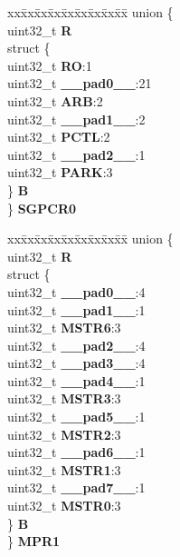 \begin{DoxyCompactItemize}
\begin{tabbing}
\end{tabbing}\item 
\mbox{\label{structXBAR__tag_a5d98b04b45ee335f1ea506401de12a4c}} 
\begin{tabbing}
xx\=xx\=xx\=xx\=xx\=xx\=xx\=xx\=xx\=\kill
union \{\\
\>uint32\_t {\bfseries R}\\
\>struct \{\\
\>\>uint32\_t {\bfseries RO}:1\\
\>\>uint32\_t {\bfseries \_\_pad0\_\_}:21\\
\>\>uint32\_t {\bfseries ARB}:2\\
\>\>uint32\_t {\bfseries \_\_pad1\_\_}:2\\
\>\>uint32\_t {\bfseries PCTL}:2\\
\>\>uint32\_t {\bfseries \_\_pad2\_\_}:1\\
\>\>uint32\_t {\bfseries PARK}:3\\
\>\} {\bfseries B}\\
\} {\bfseries SGPCR0}\\

\end{tabbing}\item 
\mbox{\label{structXBAR__tag_a027870adc24dd200af5ecada8c540bab}} 
\begin{tabbing}
xx\=xx\=xx\=xx\=xx\=xx\=xx\=xx\=xx\=\kill
union \{\\
\>uint32\_t {\bfseries R}\\
\>struct \{\\
\>\>uint32\_t {\bfseries \_\_pad0\_\_}:4\\
\>\>uint32\_t {\bfseries \_\_pad1\_\_}:1\\
\>\>uint32\_t {\bfseries MSTR6}:3\\
\>\>uint32\_t {\bfseries \_\_pad2\_\_}:4\\
\>\>uint32\_t {\bfseries \_\_pad3\_\_}:4\\
\>\>uint32\_t {\bfseries \_\_pad4\_\_}:1\\
\>\>uint32\_t {\bfseries MSTR3}:3\\
\>\>uint32\_t {\bfseries \_\_pad5\_\_}:1\\
\>\>uint32\_t {\bfseries MSTR2}:3\\
\>\>uint32\_t {\bfseries \_\_pad6\_\_}:1\\
\>\>uint32\_t {\bfseries MSTR1}:3\\
\>\>uint32\_t {\bfseries \_\_pad7\_\_}:1\\
\>\>uint32\_t {\bfseries MSTR0}:3\\
\>\} {\bfseries B}\\
\} {\bfseries MPR1}\\


\end{tabbing}
\end{DoxyCompactItemize}
